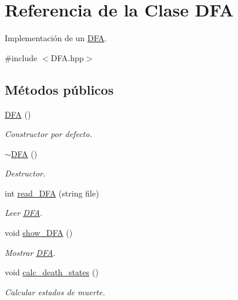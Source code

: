 \hypertarget{class_d_f_a}{}\section{Referencia de la Clase D\+FA}
\label{class_d_f_a}


Implementación de un \mbox{\hyperlink{class_d_f_a}{D\+FA}}.  




{\ttfamily \#include $<$D\+F\+A.\+hpp$>$}

\subsection*{Métodos públicos}
\begin{DoxyCompactItemize}
\item 
\mbox{\label{class_d_f_a_a0739bd751a325dd162604ed63fadea69}} 
\mbox{\hyperlink{class_d_f_a_a0739bd751a325dd162604ed63fadea69}{D\+FA}} ()
\begin{DoxyCompactList}\small\item\em Constructor por defecto. \end{DoxyCompactList}\item 
\mbox{\label{class_d_f_a_a39dad6c188c8cbb86ecff25423a99936}} 
\mbox{\hyperlink{class_d_f_a_a39dad6c188c8cbb86ecff25423a99936}{$\sim$\+D\+FA}} ()
\begin{DoxyCompactList}\small\item\em Destructor. \end{DoxyCompactList}\item 
int \mbox{\hyperlink{class_d_f_a_a835c3e271e3cfa828be10d92a7d8dca8}{read\+\_\+\+D\+FA}} (string file)
\begin{DoxyCompactList}\small\item\em Leer \mbox{\hyperlink{class_d_f_a}{D\+FA}}. \end{DoxyCompactList}\item 
void \mbox{\hyperlink{class_d_f_a_a3523d9fd18d415c21e36d8269ab534dd}{show\+\_\+\+D\+FA}} ()
\begin{DoxyCompactList}\small\item\em Mostrar \mbox{\hyperlink{class_d_f_a}{D\+FA}}. \end{DoxyCompactList}\item 
void \mbox{\hyperlink{class_d_f_a_a33120a3dd98a3bf89f090b98340aa644}{calc\+\_\+death\+\_\+states}} ()
\begin{DoxyCompactList}\small\item\em Calcular estados de muerte. \end{DoxyCompactList}\item 

\end{DoxyCompactItemize}
